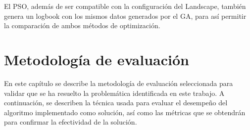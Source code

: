 \documentclass[letterpaper]{report}
\begin{document}
    El PSO, además de ser compatible con la configuración del Landscape, también
    genera un logbook con los mismos datos generados por el GA, para así
    permitir la comparación de ambos métodos de optimización. 

\chapter{Metodología de evaluación}

  En este capítulo se describe la metodología de evaluación seleccionada para
  validar que se ha resuelto la problemática identificada en este trabajo. A
  continuación, se describen la técnica usada para evaluar el desempeño del
  algoritmo implementado como solución, así como las métricas que se obtendrán
  para confirmar la efectividad de la solución.


\end{document}
